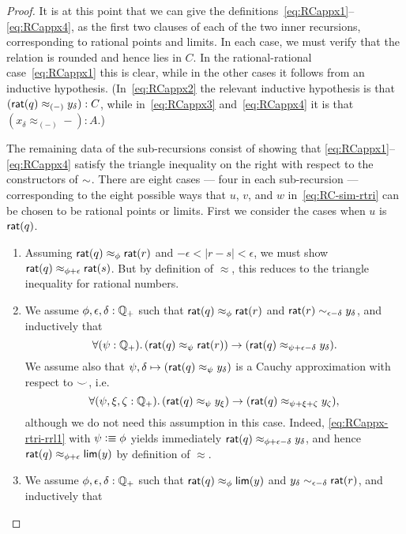 \begin{proof}
  It is at this point that we can give the definitions~\eqref{eq:RCappx1}--\eqref{eq:RCappx4}, as the first two clauses of each of the two inner recursions, corresponding to rational points and limits.
  In each case, we must verify that the relation is rounded and hence lies in $C$.
  In the rational-rational case~\eqref{eq:RCappx1} this is clear, while in the other cases it follows from an inductive hypothesis.
  (In~\eqref{eq:RCappx2} the relevant inductive hypothesis is that $(\mathsf{rat}(q) \approx_{(-)} y_\delta) : C$, while in~\eqref{eq:RCappx3} and~\eqref{eq:RCappx4} it is that $(x_\delta \approx_{(-)} -) : A$.)

  The remaining data of the sub-recursions consist of showing that \eqref{eq:RCappx1}--\eqref{eq:RCappx4} satisfy the triangle inequality on the right with respect to the constructors of $\mathord\sim$.
  There are eight cases --- four in each sub-recursion --- corresponding to the eight possible ways that $u$, $v$, and $w$ in~\eqref{eq:RC-sim-rtri} can be chosen to be rational points or limits.
  First we consider the cases when $u$ is $\mathsf{rat}(q)$.
  \begin{enumerate}
  \item Assuming $\mathsf{rat}(q)\approx_\phi \mathsf{rat}(r)$ and $-\epsilon<|r-s|<\epsilon$, we must show $\mathsf{rat}(q)\approx_{\phi+\epsilon} \mathsf{rat}(s)$.
    But by definition of $\approx$, this reduces to the triangle inequality for rational numbers.
  \item We assume $\phi,\epsilon,\delta:\mathbb{Q}_{+}$ such that $\mathsf{rat}(q)\approx_\phi \mathsf{rat}(r)$ and $\mathsf{rat}(r) \sim_{\epsilon-\delta} y_\delta$, and inductively that
    \begin{equation}
      \fall{\psi:\Qp}(\rcrat(q) \approx_{\psi} \rcrat(r)) \to (\rcrat(q) \approx_{\psi+\epsilon-\delta} y_\delta).\label{eq:RCappx-rtri-rrl1}
    \end{equation}
    We assume also that $\psi,\delta\mapsto (\mathsf{rat}(q) \approx_{\psi} y_\delta)$ is a Cauchy approximation with respect to $\smile$, i.e.\
    \begin{equation}
      \fall{\psi,\xi,\zeta:\Qp} (\rcrat(q) \approx_{\psi} y_\xi) \to (\rcrat(q) \approx_{\psi+\xi+\zeta} y_\zeta),\label{eq:RCappx-rtri-rrl2}
    \end{equation}
    although we do not need this assumption in this case.
    Indeed, \eqref{eq:RCappx-rtri-rrl1} with $\psi\vcentcolon\equiv \phi$ yields immediately $\mathsf{rat}(q) \approx_{\phi+\epsilon-\delta} y_\delta$, and hence $\mathsf{rat}(q) \approx_{\phi+\epsilon} \mathsf{lim}(y)$ by definition of $\approx$.
  \item We assume $\phi,\epsilon,\delta:\mathbb{Q}_{+}$ such that $\mathsf{rat}(q)\approx_\phi \mathsf{lim}(y)$ and $y_\delta \sim_{\epsilon-\delta} \mathsf{rat}(r)$, and inductively that

\end{enumerate}
\end{proof}
